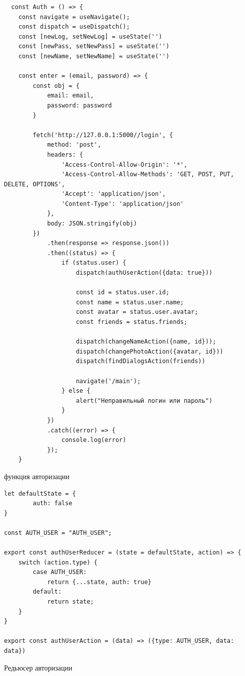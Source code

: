 \documentclass[14pt,final]{report}
\begin{document}
\begin{listing}[!h]
\begin{verbatim}
  const Auth = () => {
    const navigate = useNavigate();
    const dispatch = useDispatch();
    const [newLog, setNewLog] = useState('')
    const [newPass, setNewPass] = useState('')
    const [newName, setNewName] = useState('')

    const enter = (email, password) => {
        const obj = {
            email: email,
            password: password
        }
        
        fetch('http://127.0.0.1:5000//login', {
            method: 'post',
            headers: {
                'Access-Control-Allow-Origin': '*',
                'Access-Control-Allow-Methods': 'GET, POST, PUT, DELETE, OPTIONS',
                'Accept': 'application/json',
                'Content-Type': 'application/json'
            },
            body: JSON.stringify(obj)
        })
            .then(response => response.json())
            .then((status) => {
                if (status.user) {
                    dispatch(authUserAction({data: true}))

                    const id = status.user.id;
                    const name = status.user.name;
                    const avatar = status.user.avatar;
                    const friends = status.friends;

                    dispatch(changeNameAction({name, id}));
                    dispatch(changePhotoAction({avatar, id}))
                    dispatch(findDialogsAction(friends))

                    navigate('/main');
                } else {
                    alert("Неправильный логин или пароль")
                }
            })
            .catch((error) => {
                console.log(error)
            });
    }  
\end{verbatim}
\caption{функция авторизации}
\label{auth}
\end{listing}

\begin{listing}[!h]
\begin{verbatim}
let defaultState = {
        auth: false
}

const AUTH_USER = "AUTH_USER";

export const authUserReducer = (state = defaultState, action) => {
    switch (action.type) {
        case AUTH_USER:
            return {...state, auth: true}
        default:
            return state;
    }
}

export const authUserAction = (data) => ({type: AUTH_USER, data: data})
\end{verbatim}
\caption{Редьюсер авторизации}
\label{auth-reducer}
\end{listing}
\end{document}
